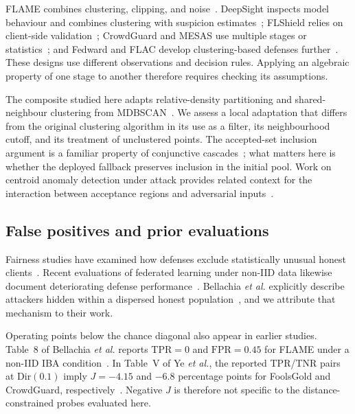 \documentclass[journal]{IEEEtran}
\begin{document}
FLAME combines clustering, clipping, and noise~\cite{nguyen2022flame}. DeepSight inspects model behaviour and combines clustering with suspicion estimates~\cite{rieger2022deepsight}; FLShield relies on client-side validation~\cite{kabir2023flshield}; CrowdGuard and MESAS use multiple stages or statistics~\cite{rieger2024crowdguard,krauss2023mesas}; and Fedward and FLAC develop clustering-based defenses further~\cite{chen2023fedward,yuan2025flac}. These designs use different observations and decision rules. Applying an algebraic property of one stage to another therefore requires checking its assumptions.

The composite studied here adapts relative-density partitioning and shared-neighbour clustering from MDBSCAN~\cite{qian2024mdbscan}. We assess a local adaptation that differs from the original clustering algorithm in its use as a filter, its neighbourhood cutoff, and its treatment of unclustered points. The accepted-set inclusion argument is a familiar property of conjunctive cascades~\cite{viola2004cascade}; what matters here is whether the deployed fallback preserves inclusion in the initial pool. Work on centroid anomaly detection under attack provides related context for the interaction between acceptance regions and adversarial inputs~\cite{kloft2012centroid}.

\subsection{False positives and prior evaluations}
Fairness studies have examined how defenses exclude statistically unusual honest clients~\cite{singh2023fair,touat2023bias,ajibuwa2025fairness}. Recent evaluations of federated learning under non-IID data likewise document deteriorating defense performance~\cite{li2025heterogeneity,ye2025illusion,zhang2025flpoison}. Bellachia \emph{et al.} explicitly describe attackers hidden within a dispersed honest population~\cite{bellachia2026sok}, and we attribute that mechanism to their work.

Operating points below the chance diagonal also appear in earlier studies. Table~8 of Bellachia \emph{et al.} reports $\mathrm{TPR}=0$ and $\mathrm{FPR}=0.45$ for FLAME under a non-IID IBA condition~\cite{bellachia2026sok}. In Table~V of Ye \emph{et al.}, the reported TPR/TNR pairs at $\mathrm{Dir}(0.1)$ imply $J=-4.15$ and $-6.8$ percentage points for FoolsGold and CrowdGuard, respectively~\cite{ye2025illusion}. Negative $J$ is therefore not specific to the distance-constrained probes evaluated here.
\end{document}
